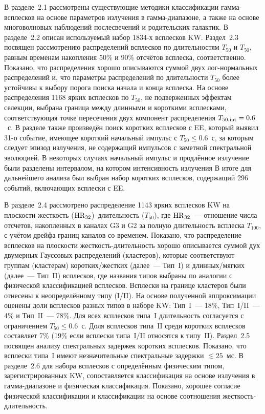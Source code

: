 В разделе~2.1 рассмотрены существующие методики классификации гамма-всплесков на основе 
параметров излучения в гамма-диапазоне, а также на основе многоволновых наблюдений 
послесвечений и родительских галактик. В разделе~2.2 описан используемый набор 1834-х всплесков KW.
Раздел~2.3 посвящен рассмотрению распределений всплесков по длительностям $T_{50}$ и $T_{50}$, 
равным временам накопления 50\% и 90\% отсчётов всплеска, соответственно. Показано,
что распределения хорошо описываются суммой двух лог-нормальных распределений и, что
параметры распределений по длительности $T_{50}$ более устойчивы к выбору 
порога поиска начала и конца всплеска. На основе распределения 1168 ярких всплесков по $T_{50}$,
не подверженных эффектам селекции, выбрана граница между длинными и  короткими всплесками, 
соответствующая точке пересечения двух компонент распределения $T_{50{\mathrm{,int}}} = 0.6$~с.
В разделе также произведён поиск коротких всплесков с EE, который выявил 31-о
событие, имеющее короткий начальный импульс с $T_{50} \le 0.6$~с, за
которым следует эпизод излучения, не содержащий импульсов с заметной
спектральной эволюцией. В некоторых случаях начальный импульс и продлённое
излучение были разделены интервалом, на котором интенсивность излучения
В итоге для дальнейшего анализа был выбран набор коротких всплесков, содержащий 296 событий, 
включающих всплески с EE.  

В разделе~2.4 рассмотрено распределение 1143 ярких всплесков KW на плоскости 
жесткость (${\mathrm{HR}}_{32}$)--длительность ($T_{50}$),
где ${\mathrm{HR}}_{32}$~--- отношение числа отсчетов, накопленных в каналах G3 и G2 
за полную длительность всплеска $T_{100}$, с учётом дрейфа границ каналов со временем.
Показано, что распределение всплесков на плоскости жесткость-длительность 
хорошо описывается суммой дух двумерных Гауссовых распределений (кластеров), которые соответствуют 
группам (кластерам) коротких/жестких (далее~--- Тип~I) и длинных/мягких (далее~--- Тип~II) всплесков,
где названия типов выбраны по аналогии с физической классификацией всплесков.
Всплески на границе кластеров были отнесены к неопределённому типу (I/II).
На основе полученной аппроксимации оценены доли всплесков разных 
типов в наборе KW: Тип~I~--- 18\%, Тип~I/II~--- 4\% и Тип~II~--- 78\%. 
Для всех всплесков типа~I длительность согласуется 
с ограничением $T_{50} \leq 0.6$~с. Доля всплесков типа~II среди коротких всплесков 
составляет 7\% (19\% если всплески типа~I/II относятся к типу~II).
Раздел~2.5 посвящен анализу спектральных задержек коротких всплесков. 
Показано, что всплески типа~I имеют незначительные спектральные задержки $\lesssim 25$~мс.
В разделе~2.6 для набора всплесков с определённым физическим типом, 
зарегистрированных KW, сопоставляется классификация на основе излучения 
в гамма-диапазоне и физическая классификация. Показано, хорошее согласие физической классификации 
и классификации на основе соотношения жесткость-длительность.

